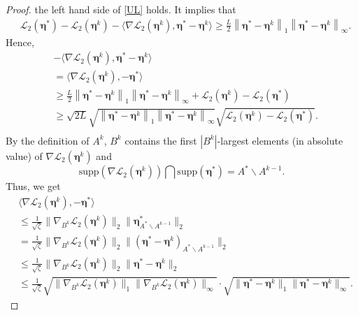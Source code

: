 \documentclass[12pt]{article}
\newcommand{\boldeta}{\boldsymbol{\eta}}
\begin{document}
\begin{appendix}
\begin{proof}
 the left hand side of  \eqref{UL} holds. It implies that
\begin{equation*}
\begin{split}
&\mathcal{L}_2(\boldeta^{*})-\mathcal{L}_2(\boldeta^k)-\langle\nabla \mathcal{L}_2(\boldeta^k),{\boldeta^*-\boldeta^k}\rangle\geq\frac{L}{2}\left\|\boldeta^*-\boldeta^k\right\|_1\left\|\boldeta^*-\boldeta^k\right\|_{\infty}.
\end{split}
\end{equation*}
Hence,
\begin{equation*}
\begin{split}
&-\langle\nabla \mathcal{L}_2(\boldeta^k),{\boldeta^*-\boldeta^k}\rangle\\
&=\langle\nabla \mathcal{L}_2(\boldeta^k),-\boldeta^*\rangle\\
&\geq\frac{L}{2}\left\|\boldeta^*-\boldeta^k\right\|_1\left\|\boldeta^*-\boldeta^k\right\|_{\infty}+\mathcal{L}_2(\boldeta^k)-\mathcal{L}_2(\boldeta^{*})\\
&\geq \sqrt{2L}\sqrt{\left\|\boldeta^*-\boldeta^k\right\|_1\left\|\boldeta^*-\boldeta^k\right\|_{\infty}}\sqrt{\mathcal{L}_2(\boldeta^k)-\mathcal{L}_2(\boldeta^{*})}.\\
\end{split}
\end{equation*}
By the definition of $A^{k}$,  $B^k$ contains the first $|B^k|$-largest elements (in absolute value) of $\nabla \mathcal{L}_2(\boldeta^k)$ and
\begin{equation*}
\mbox{supp}(\nabla \mathcal{L}_2(\boldeta^k))\bigcap \mbox{supp}(\boldeta^*)=A^{*}\backslash A^{k-1}.
\end{equation*}
 Thus,  we get
\begin{equation*}
\begin{split}
&\langle\nabla \mathcal{L}_2(\boldeta^k),-\boldeta^*\rangle\\
&\leq\frac{1}{\sqrt{\zeta}}\|\nabla_{B^k}\mathcal{L}_2(\boldeta^k)\|_2\|\boldeta_{A^*\backslash A^{k-1}}^{*}\|_2\\
&=\frac{1}{\sqrt{\zeta}}\|\nabla_{B^k}\mathcal{L}_2(\boldeta^k)\|_2\|(\boldeta^{*}-\boldeta^k)_{A^*\backslash A^{k-1}}\|_2\\
&\leq\frac{1}{\sqrt{\zeta}}\|\nabla_{B^k}\mathcal{L}_2(\boldeta^k)\|_2\|\boldeta^{*}-\boldeta^k\|_2\\
&\leq\frac{1}{\sqrt{\zeta}}\sqrt{\|\nabla_{B^k}\mathcal{L}_2(\boldeta^k)\|_1\|\nabla_{B^k}\mathcal{L}_2(\boldeta^k)\|_{\infty}}
\cdot\sqrt{\|\boldeta^{*}-\boldeta^k\|_1\|\boldeta^{*}-\boldeta^k\|_{\infty}}.

\end{split}
\end{equation*}
\end{proof}
\end{appendix}
\end{document}
